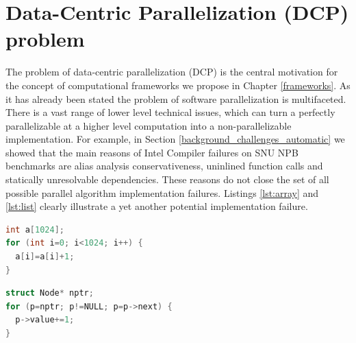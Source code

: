 \section{Data-Centric Parallelization (DCP) problem}
\label{background_dcp}
\quad The problem of data-centric parallelization (DCP) is the central motivation for the concept of computational frameworks we propose in Chapter \ref{frameworks}. As it has already been stated the problem of software parallelization is multifaceted. There is a vast range of lower level technical issues, which can turn a perfectly parallelizable at a higher level computation into a non-parallelizable implementation. For example, in Section \ref{background_challenges_automatic} we showed that the main reasons of Intel Compiler failures on SNU NPB benchmarks are alias analysis conservativeness, uninlined function calls and statically unresolvable dependencies. These reasons do not close the set of all possible parallel algorithm implementation failures. Listings \ref{lst:array} and \ref{lst:list} clearly illustrate a yet another potential implementation failure.\newline\null
\begin{minipage}[t]{0.5\linewidth}
\begin{lstlisting}[caption={\raggedright Parallelisable loop operating on what is clear to compiler a \textbf{linear array}.},label={lst:array},language=C]
int a[1024];
for (int i=0; i<1024; i++) {
  a[i]=a[i]+1;
}
\end{lstlisting}
\end{minipage}
%
\begin{minipage}[t]{0.5\linewidth}
\begin{lstlisting}[caption={\raggedright Non-parallelisable loop operating on what programmer knows is a \textbf{linked-list}.},label={lst:list},language=C]
struct Node* nptr;
for (p=nptr; p!=NULL; p=p->next) {
  p->value+=1;
}
\end{lstlisting}
\end{minipage}

